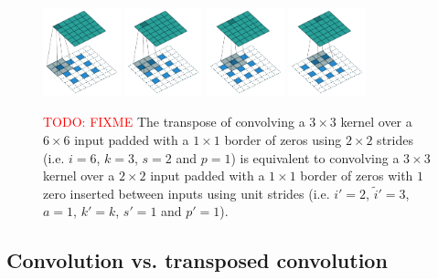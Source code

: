 \documentclass{article}
\newcommand{\todo}[1]{\textcolor{red}{TODO: #1}}
\begin{document}
\begin{figure}[t]
    \centering
    \includegraphics[width=0.2\textwidth]
        {pdf/padding_strides_odd_transposed_00.pdf}
    \includegraphics[width=0.2\textwidth]
        {pdf/padding_strides_odd_transposed_01.pdf}
    \includegraphics[width=0.2\textwidth]
        {pdf/padding_strides_odd_transposed_02.pdf}
    \includegraphics[width=0.2\textwidth]
        {pdf/padding_strides_odd_transposed_03.pdf}
    \caption{\label{fig:padding_strides_odd_transposed} \todo{FIXME} The
        transpose of convolving a $3 \times 3$ kernel over a $6 \times 6$ input
        padded with a $1 \times 1$ border of zeros using $2 \times 2$ strides
        (i.e. $i = 6$, $k = 3$, $s = 2$ and $p = 1$) is equivalent to convolving
        a $3 \times 3$ kernel over a $2 \times 2$ input padded with a $1 \times
        1$ border of zeros with $1$ zero inserted between inputs using unit
        strides (i.e. $i' = 2$, $\tilde{i}' = 3$, $a = 1$, $k' = k$, $s' = 1$
        and $p' = 1$).}
\end{figure}

\subsection{Convolution vs. transposed convolution}
\end{document}
